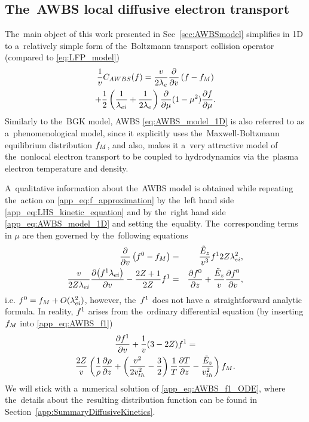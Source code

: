 \subsection{The~AWBS local diffusive electron transport}
\label{sec:AWBSDiffusiveRegime}
The~main object of this work presented in Sec~\ref{sec:AWBSmodel} simplifies
in 1D to a~relatively simple form of the~Boltzmann transport collision operator
(compared to \eqref{eq:LFP_model})
\begin{multline}
  \frac{1}{v}C_{AWBS}(f)
  = 
  \frac{v}{2\lambda_e} \frac{\partial{}}{\partial{v}}\left(f - f_M\right) \\
  + \frac{1}{2}\left(\frac{1}{\lambda_{ei}} + \frac{1}{2\lambda_e}\right)
  \frac{\partial{}}{\partial{\mu}}(1 - \mu^2)\frac{\partial{f}}{\partial{\mu}} .
  \label{app_eq:AWBS_model_1D}
\end{multline}
Similarly to the~BGK model, AWBS \ref{eq:AWBS_model_1D} 
is also referred to as a~phenomenological model, since it explicitly uses 
the~Maxwell-Boltzmann equilibrium distribution $f_M$, and also, 
makes it a~very attractive model of the~nonlocal electron
transport to be coupled to hydrodynamics via the~plasma electron temperature 
and density.

A~qualitative information about the~AWBS model is obtained while repeating
the~action on \eqref{app_eq:f_approximation} by the~left hand side 
\eqref{app_eq:LHS_kinetic_equation} and by the~right hand side 
\eqref{app_eq:AWBS_model_1D} and setting the~equality. The~corresponding terms
in $\mu$ are then governed by the~following equations
\begin{eqnarray}
  \frac{\partial{}}{\partial{v}}\left( f^0 -f_M\right) &=& 
  \frac{\tilde{E}_z}{v^3}f^1 2Z\lambda_{ei}^2 ,
  \label{app_eq:AWBS_f0} \\
  \frac{v}{2Z\lambda_{ei}}\frac{\partial{\left(f^1 \lambda_{ei}\right)}}{\partial{v}}  
  - \frac{2Z + 1}{2Z} f^1 &=&
  \frac{\partial{f^0}}{\partial{z}} + \frac{\tilde{E}_z}{v}\frac{\partial{f^0}}{\partial{v}} ,
  \label{app_eq:AWBS_f1} 
\end{eqnarray}
i.e. $f^0 = f_M + O(\lambda_{ei}^2)$, however, the~$f^1$ does not have 
a~straightforward analytic formula. In reality, $f^1$ arises from 
the~ordinary differential equation 
(by inserting $f_M$ into \eqref{app_eq:AWBS_f1})
\begin{multline}
  \frac{\partial{f^1}}{\partial{v}} + \frac{1}{v}(3-2Z)f^1
  = \\
  \frac{2Z}{v}\left(\frac{1}{\rho}\frac{\partial{\rho}}{\partial{z}} + 
  \left( \frac{v^2}{2 v_{th}^2} - \frac{3}{2}\right)
  \frac{1}{T}\frac{\partial{T}}{\partial{z}} - \frac{\tilde{E}_z}{v_{th}^2}\right)f_M .
  \label{app_eq:AWBS_f1_ODE}
\end{multline}
We will stick with a~numerical solution of \eqref{app_eq:AWBS_f1_ODE}, where
the~details about the~resulting distribution function can be found in 
Section~\ref{app:SummaryDiffusiveKinetics}. 

